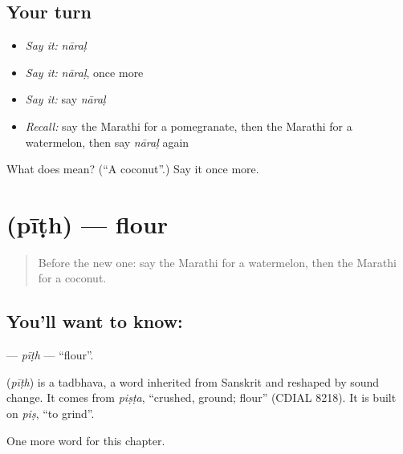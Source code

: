 \subsection*{Your turn}
\begin{itemize}
\raggedright
  \item \emph{Say it:} \emph{nāraḷ}
  \item \emph{Say it:} \emph{nāraḷ}, once more
  \item \emph{Say it:} say \emph{nāraḷ}
  \item \emph{Recall:} say the Marathi for a pomegranate, then the Marathi for a watermelon, then say \emph{nāraḷ} again
\end{itemize}

\begin{tcolorbox}[breakable,colback=teal!4,colframe=teal!35!black,title={Before you move on}]
What does  mean? (\textquotedblleft{}A coconut\textquotedblright{}.) Say it once more.
\end{tcolorbox}
\section[\texorpdfstring{\mr{पीठ} (pīṭh)}{पीठ (pīṭh)}]{ (pīṭh) — flour}

\label{lesson:MR-C138-pith}



\begin{quote}
Before the new one: say the Marathi for a watermelon, then the Marathi for a coconut.
\end{quote}

\subsection*{You'll want to know: }
\textbf{} — \emph{pīṭh} — \textquotedblleft{}flour\textquotedblright{}.

\begin{cousinweb}
\textbf{} (\emph{pīṭh}) is a tadbhava, a word inherited from Sanskrit and reshaped by sound change. It comes from \emph{piṣṭa}, \textquotedblleft{}crushed, ground; flour\textquotedblright{} (CDIAL 8218). It is built on \emph{piṣ}, \textquotedblleft{}to grind\textquotedblright{}.
\end{cousinweb}

\begin{grammarlens}[title={What you've built}]
One more word for this chapter.
\end{grammarlens}

